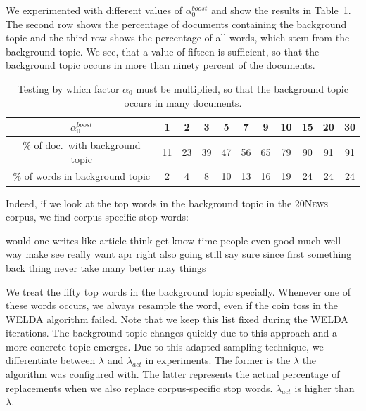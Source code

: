 \documentclass[
        a4paper,
        titlepage,
        twoside,
        parskip,
        numbers=noenddot
        ]{scrbook}
\newcommand{\ra}[1]{\renewcommand{\arraystretch}{#1}}
\newcommand{\topicbox}[1]{
  \setlength{\OuterFrameSep}{0pt}
  \begin{framed}
    #1
  \end{framed}
}
\theoremstyle{break}
\begin{document}
We experimented with different values of $\alpha_0^{boost}$ and show the results in Table~\ref{table:alpha0_boost}.
The second row shows the percentage of documents containing the background topic and the third row shows the percentage of all words, which stem from the background topic.
We see, that a value of fifteen is sufficient, so that the background topic occurs in more than ninety percent of the documents.
\begin{table}[]
  \ra{1.2}
  \centering
  \caption{Testing by which factor $\alpha_0$ must be multiplied, so that the background topic occurs in many documents.}
  \label{table:alpha0_boost}
  \begin{tabular}{ccccccccccc}
    \toprule
    $\alpha_0^{boost}$                & 1     & 2     & 3     & 5     & 7     & 9     & 10    & 15    & 20    & 30    \\
    \midrule
  \% of doc.\ with background topic  & 11  & 23  & 39  & 47  & 56  & 65  & 79  & 90  & 91  & 91  \\
  \% of words in background topic & 2   & 4   & 8   & 10  & 13  & 16  & 19  & 24  & 24  & 24 \\
    \bottomrule
  \end{tabular}
\end{table}
Indeed, if we look at the top words in the background topic in the \textsc{20News} corpus, we find corpus-specific stop words:
\topicbox{\noindent would one writes like article think get know time people even good much well way make see really want apr right also going still say sure since first something back thing never take many better may things}
We treat the fifty top words in the background topic specially.
Whenever one of these words occurs, we always resample the word, even if the coin toss in the WELDA algorithm failed.
Note that we keep this list fixed during the WELDA iterations.
The background topic changes quickly due to this approach and a more concrete topic emerges.
Due to this adapted sampling technique, we differentiate between $\lambda$ and $\lambda_{act}$ in experiments.
The former is the $\lambda$ the algorithm was configured with.
The latter represents the actual percentage of replacements when we also replace corpus-specific stop words.
$\lambda_{act}$ is higher than $\lambda$.
\end{document}
